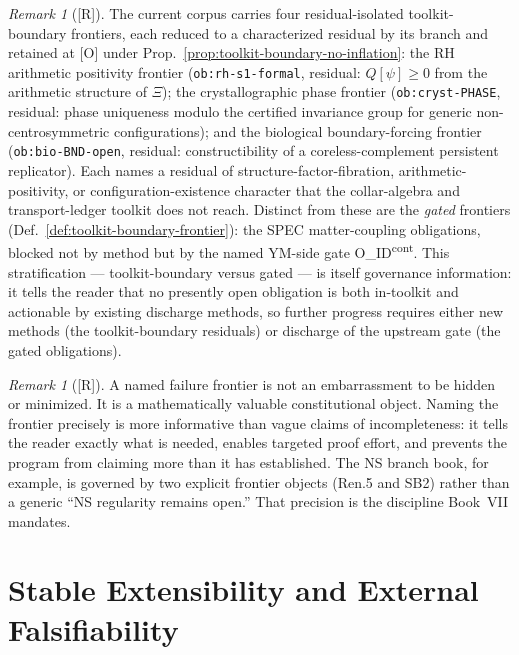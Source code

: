 \documentclass[12pt,oneside]{amsbook}
\theoremstyle{plain}
\theoremstyle{definition}
\theoremstyle{remark}
\newtheorem{remark}[theorem]{Remark}
\newcommand{\status}[1]{\textup{[#1]}}
\begin{document}
\begin{remark}[\status{R}]\label{rmk:toolkit-boundary-instances}
The current corpus carries four residual-isolated toolkit-boundary
frontiers, each reduced to a characterized residual by its branch
and retained at [O] under
Prop.~\ref{prop:toolkit-boundary-no-inflation}: the RH arithmetic
positivity frontier (\texttt{ob:rh-s1-formal}, residual: $Q[\psi]
\ge 0$ from the arithmetic structure of $\Xi$); the crystallographic
phase frontier (\texttt{ob:cryst-PHASE}, residual: phase uniqueness
modulo the certified invariance group for generic non-centrosymmetric
configurations); and the biological boundary-forcing frontier
(\texttt{ob:bio-BND-open}, residual: constructibility of a
coreless-complement persistent replicator).  Each names a residual
of structure-factor-fibration, arithmetic-positivity, or
configuration-existence character that the collar-algebra and
transport-ledger toolkit does not reach.  Distinct from these are
the \emph{gated} frontiers
(Def.~\ref{def:toolkit-boundary-frontier}): the SPEC matter-coupling
obligations, blocked not by method but by the named YM-side gate
O\_ID\textsuperscript{cont}.  This stratification --- toolkit-boundary
versus gated --- is itself governance information: it tells the
reader that no presently open obligation is both in-toolkit and
actionable by existing discharge methods, so further progress
requires either new methods (the toolkit-boundary residuals) or
discharge of the upstream gate (the gated obligations).
\end{remark}

\begin{remark}[\status{R}]\label{rmk:frontier-not-embarrassment}
A named failure frontier is not an embarrassment to be hidden or
minimized.  It is a mathematically valuable constitutional object.
Naming the frontier precisely is more informative than vague claims of
incompleteness: it tells the reader exactly what is needed, enables
targeted proof effort, and prevents the program from claiming more
than it has established.  The NS branch book, for example, is governed
by two explicit frontier objects (Ren.5 and SB2) rather than a generic
``NS regularity remains open.''  That precision is the discipline
Book~VII mandates.
\end{remark}

\section{Stable Extensibility and External Falsifiability}
\label{sec:extensibility}
\end{document}
